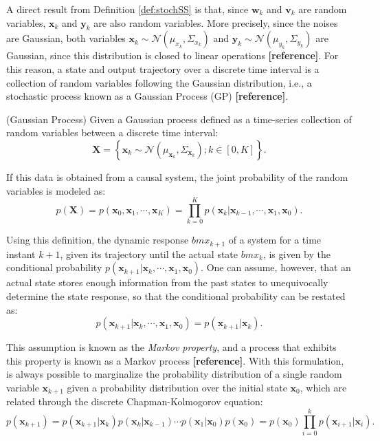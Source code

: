 \documentclass[a4paper,11pt]{book}
\numberwithin{figure}{chapter}
\numberwithin{equation}{chapter}
\numberwithin{table}{chapter}
\theoremstyle{definition}
\newtheorem{definition}{Definition}[chapter]
\newcounter{boxed-theorem}
\newcounter{boxed-definition}
\newenvironment{boxed-definition}[1]
{\begin{shaded} \begin{definition}{#1}}
{\end{definition} \end{shaded}}
\begin{document}
A direct result from Definition \ref{def:stochSS} is that, since $\bm{w}_k$ and $\bm{v}_k$ are random variables, $\bm{x}_k$ and $\bm{y}_k$ are also random variables. More precisely, since the noises are Gaussian, both variables $\bm{x}_k \sim \mathcal{N}(\mu_{x_k}, \Sigma_{x_k})$ and $\bm{y}_k \sim \mathcal{N}(\mu_{y_k}, \Sigma_{y_k})$ are Gaussian, since this distribution is closed to linear operations \textbf{[reference]}. For this reason, a state and output trajectory over a discrete time interval is a collection of random variables following the Gaussian distribution, i.e., a stochastic process known as a Gaussian Process (GP) \textbf{[reference]}.

\begin{boxed-definition}{(Gaussian Process)} \label{def:gaussianProcess}
    Given a Gaussian process defined as a time-series collection of random variables between a discrete time interval:
    \begin{equation}
        \bm{X} = \left\{ \bm{x}_k \sim \mathcal{N}(\mu_{\bm{x}_k}, \Sigma_{\bm{x}_k}) ; k \in [0, K] \right\}
    .\end{equation}
    
    If this data is obtained from a causal system, the joint probability of the random variables is modeled as:
    \begin{equation}
        p(\bm{X}) = p(\bm{x}_0, \bm{x}_1, \cdots, \bm{x}_K) = \prod_{k=0}^K p(\bm{x}_k | \bm{x}_{k-1}, \cdots, \bm{x}_1, \bm{x}_0)
    .\end{equation}
\end{boxed-definition}

Using this definition, the dynamic response $bm{x}_{k+1}$ of a system for a time instant $k+1$, given its trajectory until the actual state $bm{x}_{k}$, is given by the conditional probability $p(\bm{x}_{k+1} | \bm{x}_{k}, \cdots, \bm{x}_1, \bm{x}_0)$. One can assume, however, that an actual state stores enough information from the past states to unequivocally determine the state response, so that the conditional probability can be restated as:
\begin{equation}
    p(\bm{x}_{k+1} | \bm{x}_{k}, \cdots, \bm{x}_1, \bm{x}_0) =  p(\bm{x}_{k+1} | \bm{x}_{k})
.\end{equation}

This assumption is known as the \textit{Markov property}, and a process that exhibits this property is known as a Markov process \textbf{[reference]}. With this formulation, is always possible to marginalize the probability distribution of a single random variable $\bm{x}_{k+1}$ given a probability distribution over the initial state $\bm{x}_0$, which are related through the discrete Chapman-Kolmogorov equation:
\begin{equation}
    p(\bm{x}_{k+1}) =  p(\bm{x}_{k+1} | \bm{x}_{k}) p(\bm{x}_{k} | \bm{x}_{k-1}) \cdots p(\bm{x}_{1} | \bm{x}_{0})p(\bm{x}_0) = p(\bm{x}_0) \prod_{i=0}^k p(\bm{x}_{i+1} | \bm{x}_{i})
.\end{equation}
\end{document}

